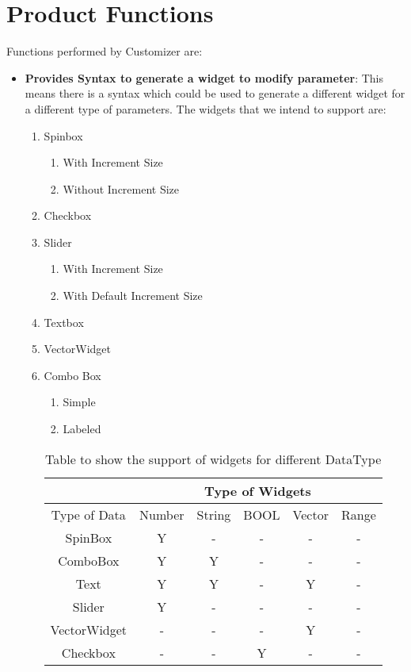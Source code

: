 \section{Product Functions}

Functions performed by Customizer are:
\begin{itemize}
    \item {\bf Provides Syntax to generate a widget to modify parameter}: This means there is a syntax which could be used to generate a different widget for a different type of parameters.
    The widgets that we intend to support are:
    \begin{enumerate}
        \item Spinbox
        \begin{enumerate}
            \item With Increment Size
            \item Without Increment Size
        \end{enumerate}
        \item Checkbox
        \item Slider
        \begin{enumerate}
            \item With Increment Size
            \item With Default Increment Size
        \end{enumerate}
        \item Textbox
        \item VectorWidget
        \item Combo Box
        \begin{enumerate}
            \item Simple
            \item Labeled
        \end{enumerate}
       
        \begin{table}[h]
            \centering
            \caption{Table to show the support of widgets for different DataType}
            \begin{tabular}{ |c|c|c|c|c|c| }
                \hline
                & \multicolumn{5}{|c|}{Type of Widgets} \\
                \hline
                Type of Data&    Number&    String&    BOOL &Vector &Range     \\ [0.5ex]
                \hline
                SpinBox&Y&    -&    -&    -&    - \\ \hline
                ComboBox&    Y&    Y&    -&    -&    - \\ \hline
                Text&    Y&    Y&    -&    Y&    - \\ \hline
                Slider&    Y&    -&    -&    -&    - \\ \hline
                VectorWidget&    -&    -&    -&    Y&- \\ \hline
                Checkbox&    -&    -&    Y&    -&    - \\ [1ex]
                \hline
            \end{tabular}


\end{table}
\end{enumerate}
\end{itemize}
